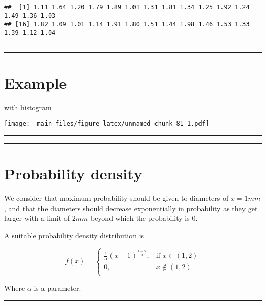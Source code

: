 \documentclass[
]{book}
\begin{document}
\begin{verbatim}
##  [1] 1.11 1.64 1.20 1.79 1.89 1.01 1.31 1.81 1.34 1.25 1.92 1.24 1.49 1.36 1.03
## [16] 1.82 1.09 1.01 1.14 1.91 1.80 1.51 1.44 1.98 1.46 1.53 1.33 1.39 1.12 1.04
\end{verbatim}

\begin{center}\rule{0.5\linewidth}{0.5pt}\end{center}

\begin{center}\rule{0.5\linewidth}{0.5pt}\end{center}

\hypertarget{example-16}{%
\section{Example}\label{example-16}}

with histogram

\texttt{[image: \_main\_files/figure-latex/unnamed-chunk-81-1.pdf]}

\begin{center}\rule{0.5\linewidth}{0.5pt}\end{center}

\begin{center}\rule{0.5\linewidth}{0.5pt}\end{center}

\hypertarget{probability-density}{%
\section{Probability density}\label{probability-density}}

We consider that maximum probability should be given to diameters of \(x=1mm\), and that the diameters should decrease exponentially in probability as they get larger with a limit of \(2mm\) beyond which the probability is \(0\).

A suitable probability density distribution is

\[
    f(x)= 
\begin{cases}
\frac{1}{\alpha}(x-1)^{\frac{1-\alpha}{\alpha}},& \text{if } x \in (1,2)\\
    0,& x \notin (1,2)\\
\end{cases}
\]

Where \(\alpha\) is a parameter.

\begin{center}\rule{0.5\linewidth}{0.5pt}\end{center}
\end{document}
